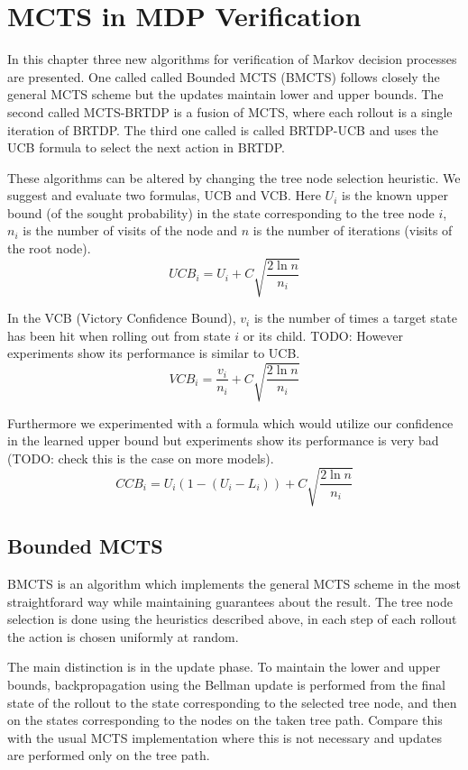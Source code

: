 \chapter{MCTS in MDP Verification}

In this chapter three new algorithms for verification of Markov decision
processes are presented. One called called Bounded MCTS (BMCTS) follows
closely the general MCTS scheme but the updates maintain lower and upper
bounds. The second called MCTS-BRTDP is a fusion of MCTS, where each
rollout is a single iteration of BRTDP.  The third one called is called
BRTDP-UCB and uses the UCB formula to select the next action in BRTDP.

These algorithms can be altered by changing the tree node selection
heuristic. We suggest and evaluate two formulas, UCB and VCB. Here $U_i$
is the known upper bound (of the sought probability) in the state
corresponding to the tree node $i$, $n_i$ is the number of visits of the
node and $n$ is the number of iterations (visits of
the root node).
\begin{equation*}
    UCB_i = U_i + C \sqrt{ \frac{2 \ln n}{n_i} }
\end{equation*}

In the VCB (Victory Confidence Bound), $v_i$ is the number of times a
target state has been hit when rolling out from state $i$ or its child.
TODO: However experiments show its performance is similar to UCB.
\[
    VCB_i = \frac{v_i}{n_i} + C \sqrt{ \frac{2 \ln n}{n_i} }
\]

Furthermore we experimented with a formula which would utilize our
confidence in the learned upper bound but experiments show its
performance is very bad (TODO: check this is the case on more models).
\[
    CCB_i = U_i (1 - (U_i - L_i)) + C \sqrt{ \frac{2 \ln n}{n_i} }
\]

\pagebreak

\section{Bounded MCTS}

BMCTS is an algorithm which implements the general MCTS scheme in the
most straightforard way while maintaining guarantees about the result.
The tree node selection is done using the
heuristics described above, in each step of each rollout the action is
chosen uniformly at random.

The main distinction is in the update phase. To maintain the lower and
upper bounds, backpropagation using the Bellman update is performed
from the final state of the rollout to the state corresponding to
the selected tree node, and then on the states corresponding to the
nodes on the taken tree path. Compare this with the usual MCTS
implementation where this is not necessary and updates are performed
only on the tree path.

